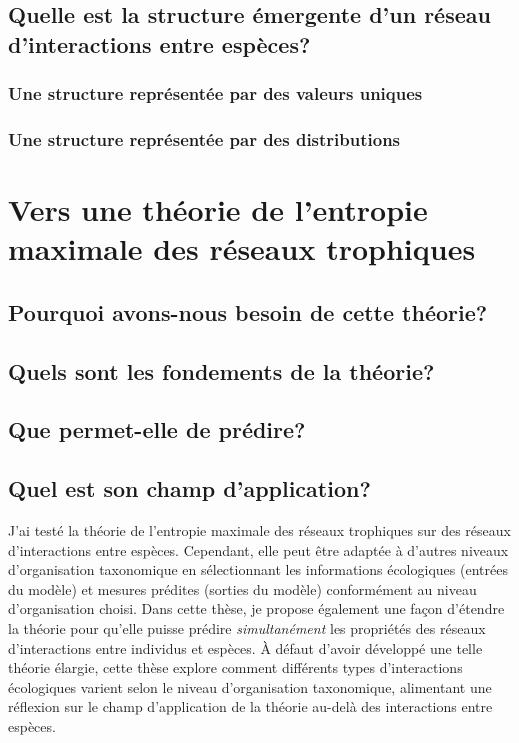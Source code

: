 \subsection{Quelle est la structure émergente d'un réseau d'interactions entre espèces?} 

\subsubsection{Une structure représentée par des valeurs uniques} 

\subsubsection{Une structure représentée par des distributions} 



\section{Vers une théorie de l'entropie maximale des réseaux trophiques}

\subsection{Pourquoi avons-nous besoin de cette théorie?} 

\subsection{Quels sont les fondements de la théorie?} 

\subsection{Que permet-elle de prédire?} 

\subsection{Quel est son champ d'application?} 

J'ai testé la théorie de l'entropie maximale des réseaux trophiques sur des
réseaux d'interactions entre espèces. Cependant, elle peut être adaptée à
d'autres niveaux d'organisation taxonomique en sélectionnant les informations
écologiques (entrées du modèle) et mesures prédites (sorties du modèle)
conformément au niveau d'organisation choisi. Dans cette thèse, je propose
également une façon d'étendre la théorie pour qu'elle puisse prédire
\textit{simultanément} les propriétés des réseaux d'interactions entre individus
et espèces. À défaut d'avoir développé une telle théorie élargie, cette thèse
explore comment différents types d'interactions écologiques varient selon le
niveau d'organisation taxonomique, alimentant une réflexion sur le champ
d'application de la théorie au-delà des interactions entre espèces. 

